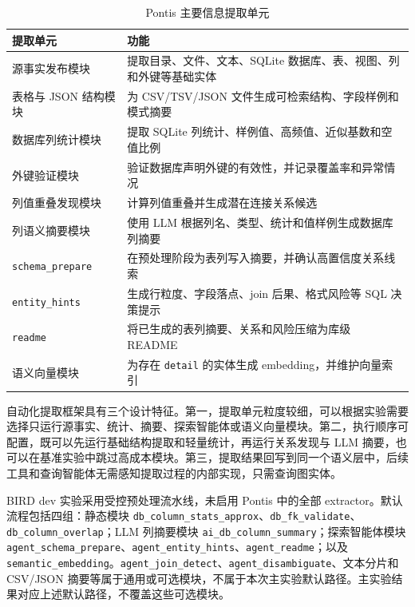 \documentclass[
    bachelor,
    pdflinks,
]{xjtuthesis}
\newcommand{\topcaption}[1]{\caption{#1}}
\begin{document}
\begin{table}[htbp]\small
  \centering
  \topcaption{Pontis 主要信息提取单元}
  \label{tab:extractors}
  \begin{tabularx}{\textwidth}{lX}
    \toprule[1.5pt]
    \textbf{提取单元} & \textbf{功能} \\
    \midrule[1pt]
    源事实发布模块 & 提取目录、文件、文本、SQLite 数据库、表、视图、列和外键等基础实体 \\
    表格与 JSON 结构模块 & 为 CSV/TSV/JSON 文件生成可检索结构、字段样例和模式摘要 \\
    数据库列统计模块 & 提取 SQLite 列统计、样例值、高频值、近似基数和空值比例 \\
    外键验证模块 & 验证数据库声明外键的有效性，并记录覆盖率和异常情况 \\
    列值重叠发现模块 & 计算列值重叠并生成潜在连接关系候选 \\
    列语义摘要模块 & 使用 LLM 根据列名、类型、统计和值样例生成数据库列摘要 \\
    \texttt{schema\_prepare} & 在预处理阶段为表列写入摘要，并确认高置信度关系线索 \\
    \texttt{entity\_hints} & 生成行粒度、字段落点、join 后果、格式风险等 SQL 决策提示 \\
    \texttt{readme} & 将已生成的表列摘要、关系和风险压缩为库级 README \\
    语义向量模块 & 为存在 \texttt{detail} 的实体生成 embedding，并维护向量索引 \\
    \bottomrule[1.5pt]
  \end{tabularx}
\end{table}

自动化提取框架具有三个设计特征。第一，提取单元粒度较细，可以根据实验需要选择只运行源事实、统计、摘要、探索智能体或语义向量模块。第二，执行顺序可配置，既可以先运行基础结构提取和轻量统计，再运行关系发现与 LLM 摘要，也可以在基准实验中跳过高成本模块。第三，提取结果回写到同一个语义层中，后续工具和查询智能体无需感知提取过程的内部实现，只需查询图实体。

BIRD dev 实验采用受控预处理流水线，未启用 Pontis 中的全部 extractor。默认流程包括四组：静态模块 \texttt{db\_column\_stats\_approx}、\texttt{db\_fk\_validate}、\texttt{db\_column\_overlap}；LLM 列摘要模块 \texttt{ai\_db\_column\_summary}；探索智能体模块 \texttt{agent\_schema\_prepare}、\texttt{agent\_entity\_hints}、\texttt{agent\_readme}；以及 \texttt{semantic\_embedding}。\texttt{agent\_join\_detect}、\texttt{agent\_disambiguate}、文本分片和 CSV/JSON 摘要等属于通用或可选模块，不属于本次主实验默认路径。主实验结果对应上述默认路径，不覆盖这些可选模块。
\end{document}
